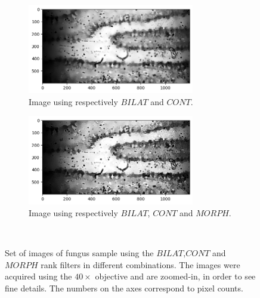 \begin{figure}[h!]
    \begin{subfigure}[b]{0.5\textwidth}
        \centering
        \includegraphics[width=0.8\textwidth]{afbeeldingen/rank/img_cont_bilat.png}
        \vspace{3mm}
        \caption{Image using respectively $BILAT$ and $CONT$.}
        \label{fig_rank_cont_bilat}
    \end{subfigure}
    \begin{subfigure}[b]{0.5\textwidth}
        \centering
        \includegraphics[width=0.8\textwidth]{afbeeldingen/rank/img_morph_cont_bilat.png}
        \caption[width=1\textwidth]{Image using respectively $BILAT$, $CONT$ and $MORPH$.}
        \label{fig_rank_morph_cont_bilat}
    \end{subfigure}
\\

    \caption{Set of images of fungus sample using the $BILAT$,$CONT$ and $MORPH$ rank filters in different combinations. The images were acquired using the $40 \times$ objective and are zoomed-in, in order to see fine details. The numbers on the axes correspond to pixel counts.}
	\label{fig_rank}
\end{figure}
\clearpage
